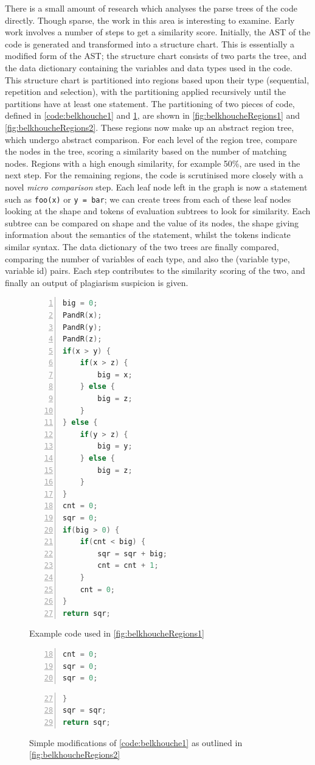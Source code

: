 There is a small amount of research which analyses the parse trees
of the code directly. Though sparse, the work in this area is interesting
to examine. Early work \cite{Belkhouche} involves a number of steps to get
a similarity score. Initially, the AST of the code is generated and transformed
into a structure chart. This is essentially a modified form of the AST;
the structure chart consists of two parts the tree, and the data dictionary
containing the variables and data types used in the code\cite{Belkhouche}. This structure
chart is partitioned into regions based upon their type (sequential, repetition
and selection), with the partitioning applied recursively until the partitions
have at least one statement. The partitioning of two pieces of code, defined in
\cref{code:belkhouche1} and \cref{code:belkhouche2}, are shown in
\cref{fig:belkhoucheRegions1} and \cref{fig:belkhoucheRegions2}. These regions
now make up an abstract region tree, which undergo abstract comparison. For
each level of the region tree, compare the nodes in the tree, scoring a similarity
based on the number of matching nodes. Regions with a high enough similarity,
for example 50\%, are used in the next step. For the remaining regions, the code
is scrutinised more closely with a novel \emph{micro comparison} step. Each
leaf node left in the graph is now a statement such as \texttt{foo(x)} or
\texttt{y = bar}; we can create trees from each of these leaf nodes
looking at the shape and tokens of evaluation subtrees to look for similarity. 
Each subtree can be compared on shape and the value of its nodes, the shape
giving information about the semantics of the statement, whilst the tokens
indicate similar syntax.
The data dictionary of the two trees are finally compared, comparing the number
of variables of each type, and also the (variable type, variable id) pairs.
Each step contributes to the similarity scoring of the two, and finally an output
of plagiarism suspicion is given.

\begin{figure}[p]
\begin{lstlisting}[language=C, numbers=left]
big = 0;
PandR(x);
PandR(y);
PandR(z);
if(x > y) {
	if(x > z) {
		big = x;
	} else {
		big = z;
	}
} else {
	if(y > z) {
		big = y;
	} else {
		big = z;
	}
}
cnt = 0;
sqr = 0;
if(big > 0) {
	if(cnt < big) {
		sqr = sqr + big;
		cnt = cnt + 1;
	}
	cnt = 0;
}
return sqr;
\end{lstlisting}
\caption{Example code used in \cref{fig:belkhoucheRegions1}}
\label{code:belkhouche1}

\begin{lstlisting}[firstnumber=18, language=C, numbers=left]
cnt = 0;
sqr = 0;
sqr = 0;
\end{lstlisting}

\begin{lstlisting}[firstnumber=27, language=C, numbers=left]
}
sqr = sqr;
return sqr;
\end{lstlisting}
\caption{Simple modifications of \cref{code:belkhouche1} as outlined in
\cref{fig:belkhoucheRegions2}}
\label{code:belkhouche2}
\end{figure}


